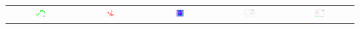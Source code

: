 \documentclass{beamer}
\begin{document}
\begin{frame}[containsverbatim]
      \begin{tabular}{@{}c@{}c@{}c@{}c@{}c@{}}
      \includegraphics[width=0.2\textwidth]{figures/plot_kriging.png}&
      \includegraphics[width=0.2\textwidth]{figures/plot_random_walk.png}&
      \includegraphics[width=0.2\textwidth]{figures/plot_sobol_field.png}&
      \includegraphics[width=0.2\textwidth]{figures/plot_monte_carlo.png}&
      \includegraphics[width=0.2\textwidth]{figures/plot_distribution_fitting.png}
      \end{tabular}
    \end{frame}


\end{document}
